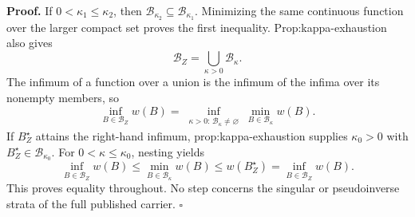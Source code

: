 \textbf{Proof.}
If \(0<\kappa_1\le\kappa_2\), then \(\mathcal B_{\kappa_2}\subseteq\mathcal B_{\kappa_1}\).  Minimizing the same continuous function over the larger compact set proves the first inequality.  Prop:kappa-exhaustion also gives
\[
 \mathcal B_Z=\bigcup_{\kappa>0}\mathcal B_\kappa.
\]
The infimum of a function over a union is the infimum of the infima over its nonempty members, so
\[
 \inf_{B\in\mathcal B_Z}w(B)
 =\inf_{\substack{\kappa>0:\,\mathcal B_\kappa\ne\varnothing}}
 \min_{B\in\mathcal B_\kappa}w(B).
\]
If \(B_Z^\star\) attains the right-hand infimum, prop:kappa-exhaustion supplies \(\kappa_0>0\) with \(B_Z^\star\in\mathcal B_{\kappa_0}\).  For \(0<\kappa\le\kappa_0\), nesting yields
\[
 \inf_{B\in\mathcal B_Z}w(B)
 \le\min_{B\in\mathcal B_\kappa}w(B)
 \le w(B_Z^\star)
 =\inf_{B\in\mathcal B_Z}w(B).
\]
This proves equality throughout.  No step concerns the singular or pseudoinverse strata of the full published carrier. \(\square\)